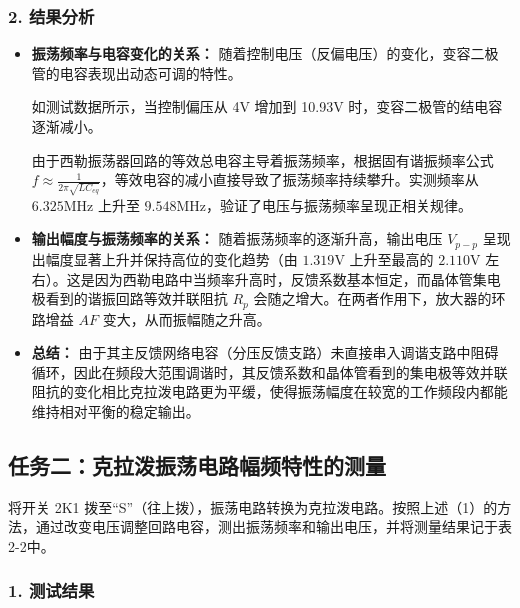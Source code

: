 \documentclass[12pt]{article}
\begin{document}
\subsubsection*{2. 结果分析}
\begin{itemize}
    \item \textbf{振荡频率与电容变化的关系：} 随着控制电压（反偏电压）的变化，变容二极管的电容表现出动态可调的特性。
    
    如测试数据所示，当控制偏压从 4V 增加到 10.93V 时，变容二极管的结电容逐渐减小。
    
    由于西勒振荡器回路的等效总电容主导着振荡频率，根据固有谐振频率公式 $f \approx \frac{1}{2\pi\sqrt{L C_{eq}}}$，等效电容的减小直接导致了振荡频率持续攀升。实测频率从 $6.325\text{MHz}$ 上升至 $9.548\text{MHz}$，验证了电压与振荡频率呈现正相关规律。
    \item \textbf{输出幅度与振荡频率的关系：} 随着振荡频率的逐渐升高，输出电压 $V_{p-p}$ 呈现出幅度显著上升并保持高位的变化趋势（由 $1.319\text{V}$ 上升至最高的 $2.110\text{V}$ 左右）。这是因为西勒电路中当频率升高时，反馈系数基本恒定，而晶体管集电极看到的谐振回路等效并联阻抗 $R_p$ 会随之增大。在两者作用下，放大器的环路增益 $AF$ 变大，从而振幅随之升高。
    \item \textbf{总结：} 由于其主反馈网络电容（分压反馈支路）未直接串入调谐支路中阻碍循环，因此在频段大范围调谐时，其反馈系数和晶体管看到的集电极等效并联阻抗的变化相比克拉泼电路更为平缓，使得振荡幅度在较宽的工作频段内都能维持相对平衡的稳定输出。
\end{itemize}

\subsection*{任务二：克拉泼振荡电路幅频特性的测量}

将开关 2K1 拨至“S”（往上拨），振荡电路转换为克拉泼电路。按照上述（1）的方法，通过改变电压调整回路电容，测出振荡频率和输出电压，并将测量结果记于表2-2中。

\subsubsection*{1. 测试结果}

\begin{table}[H]
    \centering
    \caption{克拉泼振荡电路特性测试}
    \label{tab:clapp_results}
\end{table}
\end{document}
